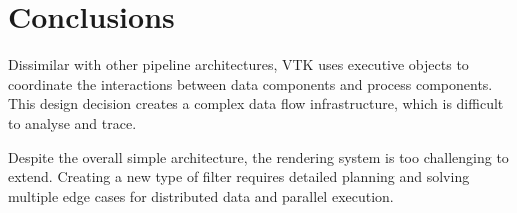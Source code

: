 \section{Conclusions}

\begin{conclusion}
Dissimilar with other pipeline architectures, VTK uses executive objects to coordinate the interactions between data components and process components. This design decision creates a complex data flow infrastructure, which is difficult to analyse and trace.
\end{conclusion}

\begin{conclusion}
Despite the overall simple architecture, the rendering system is too challenging to extend. Creating a new type of filter requires detailed planning and solving multiple edge cases for distributed data and parallel execution.
\end{conclusion}
